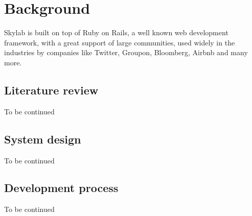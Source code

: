 \chapter{Background}

Skylab is built on top of Ruby on Rails, a well known web development framework, with a great support of large communities, used widely in the industries by companies like Twitter, Groupon, Bloomberg, Airbnb and many more.  

\section{Literature review}

To be continued

\section{System design}

To be continued

\section{Development process}

To be continued